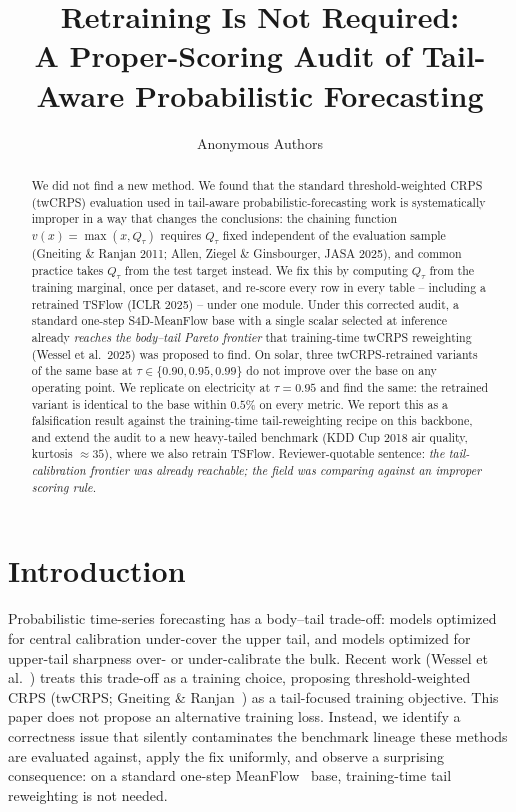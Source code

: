 \documentclass{article}
\title{Retraining Is Not Required:\\
A Proper-Scoring Audit of Tail-Aware Probabilistic Forecasting}
\author{Anonymous Authors}
\begin{document}
\maketitle

\begin{abstract}
We did not find a new method. We found that the standard
threshold-weighted CRPS (twCRPS) evaluation used in tail-aware
probabilistic-forecasting work is systematically improper in a way
that changes the conclusions: the chaining function
$v(x) = \max(x, Q_\tau)$ requires $Q_\tau$ fixed independent of the
evaluation sample (Gneiting \& Ranjan 2011; Allen, Ziegel \&
Ginsbourger, JASA 2025), and common practice takes $Q_\tau$ from the
test target instead. We fix this by computing $Q_\tau$ from the
training marginal, once per dataset, and re-score every row in every
table -- including a retrained TSFlow (ICLR 2025) -- under one
module. Under this corrected audit, a standard one-step
S4D-MeanFlow base with a single scalar selected at inference already
\emph{reaches the body--tail Pareto frontier} that training-time
twCRPS reweighting (Wessel et al.\ 2025) was proposed to find. On
solar, three twCRPS-retrained variants of the same base at $\tau \in
\{0.90, 0.95, 0.99\}$ do not improve over the base on any operating
point. We replicate on electricity at $\tau{=}0.95$ and find the
same: the retrained variant is identical to the base within $0.5\%$
on every metric. We report this as a falsification result against
the training-time tail-reweighting recipe on this backbone, and
extend the audit to a new heavy-tailed benchmark (KDD Cup 2018 air
quality, kurtosis $\approx 35$), where we also retrain TSFlow.
Reviewer-quotable sentence: \emph{the tail-calibration frontier was
already reachable; the field was comparing against an improper
scoring rule.}
\end{abstract}

\section{Introduction}
\label{sec:intro}

Probabilistic time-series forecasting has a body--tail trade-off:
models optimized for central calibration under-cover the upper tail,
and models optimized for upper-tail sharpness over- or
under-calibrate the bulk. Recent work (Wessel et al.~\cite{wessel2025tail})
treats this trade-off as a training choice, proposing threshold-weighted
CRPS (twCRPS; Gneiting \& Ranjan~\cite{gneiting2011weighted}) as a
tail-focused training objective. This paper does not propose an
alternative training loss. Instead, we identify a correctness
issue that silently contaminates the benchmark lineage these methods
are evaluated against, apply the fix uniformly, and observe a
surprising consequence: on a standard one-step
MeanFlow~\cite{geng2025meanflow} base, training-time tail reweighting
is not needed.
\end{document}
